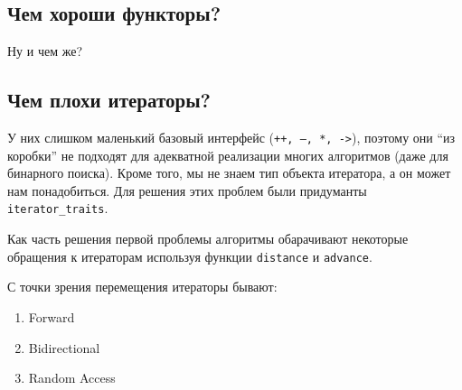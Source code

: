 \documentclass[a4paper,12pt]{article}
\newcommand{\cc}{\texttt}
\begin{document}
\subsection{Чем хороши функторы?}
Ну и чем же? %

\subsection{Чем плохи итераторы?}
У них слишком маленький базовый интерфейс (\cc{++, --, *, ->}), поэтому они ``из коробки'' не подходят для адекватной реализации многих алгоритмов (даже для бинарного поиска). Кроме того, мы не знаем тип объекта итератора, а он может нам понадобиться.
Для решения этих проблем были придуманты \cc{iterator_traits}.

Как часть решения первой проблемы алгоритмы обарачивают некоторые обращения к итераторам используя функции \cc{distance} и \cc{advance}.

С точки зрения перемещения итераторы бывают:
\begin{enumerate}
    \item Forward
    \item Bidirectional
    \item Random Access
\end{enumerate}


\end{document}
